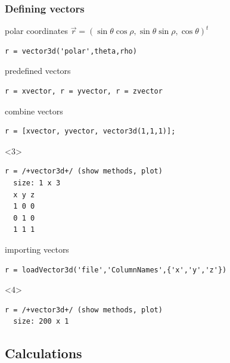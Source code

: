 \documentclass[compress]{beamer}
\begin{document}
\begin{frame}
  \frametitle{Defining vectors}

  \begin{overlayarea}{\textwidth}{8cm}

    polar coordinates $\vec r = (\sin \theta \cos \rho,\sin \theta \sin \rho,\cos \theta)^{t}$

\begin{lstlisting}[style=input]
r = vector3d('polar',theta,rho)
\end{lstlisting}

  \pause \medskip

  predefined vectors
\begin{lstlisting}[style=input]
r = xvector, r = yvector, r = zvector
\end{lstlisting}

  \pause \medskip

  combine vectors
\begin{lstlisting}[style=input]
r = [xvector, yvector, vector3d(1,1,1)];
\end{lstlisting}

\begin{onlyenv}<3>
  \vspace{-.3cm}
\begin{lstlisting}[style=output]
r = /+vector3d+/ (show methods, plot)
  size: 1 x 3
  x y z
  1 0 0
  0 1 0
  1 1 1
\end{lstlisting}
\end{onlyenv}

  \pause \medskip

  importing vectors
\begin{lstlisting}[style=input]
r = loadVector3d('file','ColumnNames',{'x','y','z'})
\end{lstlisting}
\begin{onlyenv}<4>
  \vspace{-.3cm}
\begin{lstlisting}[style=output]
r = /+vector3d+/ (show methods, plot)
  size: 200 x 1
\end{lstlisting}
\end{onlyenv}

\end{overlayarea}
\end{frame}

\subsection*{Calculations}
\end{document}
